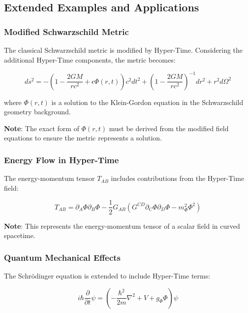 \documentclass[11pt,a4paper]{article}
\begin{document}
\subsection{Extended Examples and Applications}

\subsubsection{Modified Schwarzschild Metric}

The classical Schwarzschild metric is modified by Hyper-Time. Considering the additional Hyper-Time components, the metric becomes:

\begin{equation}
ds^2 = -\left(1 - \frac{2GM}{rc^2} + \epsilon \Phi(r, t) \right)c^2 dt^2 + \left(1 - \frac{2GM}{rc^2}\right)^{-1} dr^2 + r^2 d\Omega^2
\end{equation}

where $\Phi(r, t)$ is a solution to the Klein-Gordon equation in the Schwarzschild geometry background.

\textbf{Note}: The exact form of $\Phi(r, t)$ must be derived from the modified field equations to ensure the metric represents a solution.

\subsubsection{Energy Flow in Hyper-Time}

The energy-momentum tensor $T_{AB}$ includes contributions from the Hyper-Time field:

\begin{equation}
T_{AB} = \partial_A \Phi \partial_B \Phi - \frac{1}{2} G_{AB} \left( G^{CD} \partial_C \Phi \partial_D \Phi - m_\Phi^2 \Phi^2 \right)
\end{equation}

\textbf{Note}: This represents the energy-momentum tensor of a scalar field in curved spacetime.

\subsubsection{Quantum Mechanical Effects}

The Schrödinger equation is extended to include Hyper-Time terms:

\begin{equation}
i\hbar \frac{\partial}{\partial t} \psi = \left( -\frac{\hbar^2}{2m} \nabla^2 + V + g_\Phi \Phi \right) \psi
\end{equation}
\end{document}
